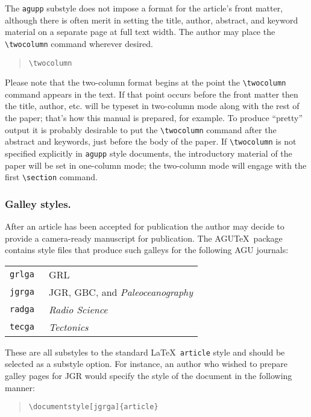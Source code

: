 The {\tt agupp} substyle does not impose a format for the 
article's front matter, although there is often merit in 
setting the title, author, abstract, and keyword material 
on a separate page at full text width.  The author may 
place the \verb"\twocolumn" command wherever desired.
\begin{quote}
\verb"\twocolumn"
\end{quote}
Please note that the two-column format begins at the point 
the \verb"\twocolumn" command appears in the text.  If that 
point occurs before the front matter then the title, author, 
etc. will be typeset in two-column mode along with the rest 
of the paper; that's how this manual is prepared, for example.
To produce ``pretty'' output it is probably desirable to put 
the \verb"\twocolumn" command after the abstract and keywords, 
just before the body of the paper. If \verb"\twocolumn" is not 
specified explicitly in {\tt agupp} style documents, the 
introductory material of the paper will be set in one-column 
mode; the two-column mode will engage with the first 
\verb"\section" command.

\subsubsection{Galley styles.}
After an article has been accepted for publication the author may 
decide to provide a camera-ready manuscript for publication.  The 
AGU\TeX\ package contains style files that produce such galleys for 
the following AGU journals:
\begin{center}
\begin{tabular}{ll}
\tt grlga & GRL\\
\tt jgrga & JGR, GBC, and {\it Paleoceanography} \\
\tt radga & {\it Radio Science} \\
\tt tecga & {\it Tectonics} \\
\end{tabular}
\end{center}
These are all substyles to the standard \LaTeX\ {\tt article} 
style and should be selected as a substyle option.  For instance, 
an author who wished to prepare galley pages for JGR would 
specify the style of the document in the following manner:
\begin{quote}
\verb"\documentstyle[jgrga]{article}"
\end{quote}

